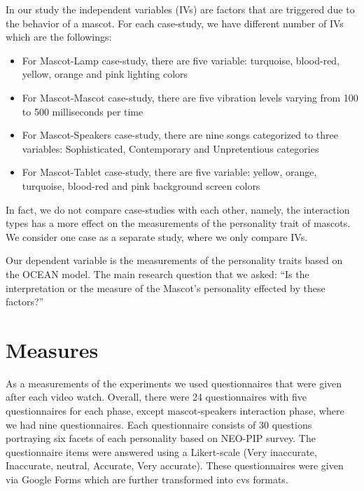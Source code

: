 \par In our study the independent variables (IVs) are factors that are triggered due to the behavior of a mascot. For each case-study, we have different number of IVs which are the followings:
\begin{itemize}
  \item For Mascot-Lamp case-study, there are five variable: turquoise, blood-red, yellow, orange and pink lighting colors
  \item For Mascot-Mascot case-study, there are five vibration levels varying from 100 to 500 milliseconds per time
  \item For Mascot-Speakers case-study, there are nine songs categorized to three variables: Sophisticated, Contemporary and Unpretentious categories
   \item For Mascot-Tablet case-study, there are five variable: yellow, orange, turquoise, blood-red and pink background screen colors
\end{itemize}

\par In fact, we do not compare case-studies with each other, namely, the interaction types has a more effect on the measurements of the personality trait of mascots. We consider one case as a separate study, where we only compare IVs.
\par Our dependent variable is the measurements of the personality traits based on the OCEAN model. The main research question that we asked: “Is the interpretation or the measure of the Mascot’s personality effected by these factors?”

\section{Measures}
As a measurements of the experiments we used questionnaires that were given after each video watch. Overall, there were 24 questionnaires with five questionnaires for each phase, except mascot-speakers interaction phase, where we had nine questionnaires. Each questionnaire consists of 30 questions portraying six facets of each personality based on NEO-PIP survey. The questionnaire items were answered using a Likert-scale (Very inaccurate, Inaccurate, neutral, Accurate, Very accurate). These questionnaires were given via Google Forms which are further transformed into cvs formats.



